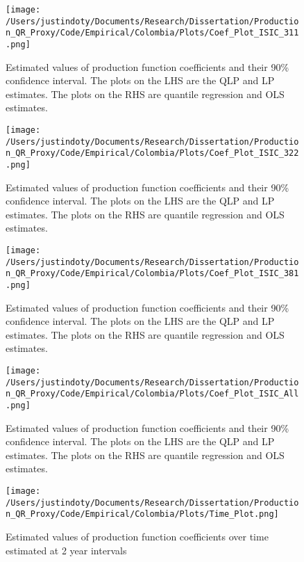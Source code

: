 \documentclass[11pt]{article}
\begin{document}



\begin{figure}[H]
\centering
\texttt{[image: /Users/justindoty/Documents/Research/Dissertation/Production\_QR\_Proxy/Code/Empirical/Colombia/Plots/Coef\_Plot\_ISIC\_311.png]}
\caption{Estimated values of production function coefficients and their 90\% confidence interval. The plots on the LHS are the QLP and LP estimates. The plots on the RHS are quantile regression and OLS estimates.}
\end{figure}

\begin{figure}[H]
\centering
\texttt{[image: /Users/justindoty/Documents/Research/Dissertation/Production\_QR\_Proxy/Code/Empirical/Colombia/Plots/Coef\_Plot\_ISIC\_322.png]}
\caption{Estimated values of production function coefficients and their 90\% confidence interval. The plots on the LHS are the QLP and LP estimates. The plots on the RHS are quantile regression and OLS estimates.}
\end{figure}

\begin{figure}[H]
\centering
\texttt{[image: /Users/justindoty/Documents/Research/Dissertation/Production\_QR\_Proxy/Code/Empirical/Colombia/Plots/Coef\_Plot\_ISIC\_381.png]}
\caption{Estimated values of production function coefficients and their 90\% confidence interval. The plots on the LHS are the QLP and LP estimates. The plots on the RHS are quantile regression and OLS estimates.}
\end{figure}

\begin{figure}[H]
\centering
\texttt{[image: /Users/justindoty/Documents/Research/Dissertation/Production\_QR\_Proxy/Code/Empirical/Colombia/Plots/Coef\_Plot\_ISIC\_All.png]}
\caption{Estimated values of production function coefficients and their 90\% confidence interval. The plots on the LHS are the QLP and LP estimates. The plots on the RHS are quantile regression and OLS estimates.}
\end{figure}

\begin{figure}[H]
\centering
\texttt{[image: /Users/justindoty/Documents/Research/Dissertation/Production\_QR\_Proxy/Code/Empirical/Colombia/Plots/Time\_Plot.png]}
\caption{Estimated values of production function coefficients over time estimated at 2 year intervals}
\end{figure}
\end{document}
